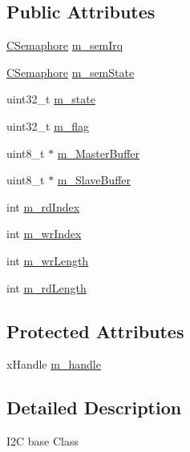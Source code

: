 \subsection*{Public Attributes}
\begin{DoxyCompactItemize}
\item 
\hyperlink{class_c_semaphore}{C\-Semaphore} \hyperlink{class_c_i2_c_afe268dd16ca42e8542c67a7f574df789}{m\-\_\-sem\-Irq}
\item 
\hyperlink{class_c_semaphore}{C\-Semaphore} \hyperlink{class_c_i2_c_aed6c05c74c281a6ae0dcc8e0203511b1}{m\-\_\-sem\-State}
\item 
uint32\-\_\-t \hyperlink{class_c_i2_c_aa2da331d3ad66d64a25d63405882be4c}{m\-\_\-state}
\item 
uint32\-\_\-t \hyperlink{class_c_i2_c_a4c29db1010457d99b12ac6097219bcc8}{m\-\_\-flag}
\item 
uint8\-\_\-t $\ast$ \hyperlink{class_c_i2_c_ae7fd0860329b89d55cfe5ca214b705e2}{m\-\_\-\-Master\-Buffer}
\item 
uint8\-\_\-t $\ast$ \hyperlink{class_c_i2_c_a4ef901e7efdef3f95faa2dd08d548aed}{m\-\_\-\-Slave\-Buffer}
\item 
int \hyperlink{class_c_i2_c_ad8b02ac3b8cfe93c0e123f7c4d79709b}{m\-\_\-rd\-Index}
\item 
int \hyperlink{class_c_i2_c_ad2e77f79779205f9c2ae13f7a4fc9168}{m\-\_\-wr\-Index}
\item 
int \hyperlink{class_c_i2_c_afc1ac8b1f15f1e74dd4a884fb9fe342a}{m\-\_\-wr\-Length}
\item 
int \hyperlink{class_c_i2_c_a517d08ec5c1a44662ab923bb74c6a25c}{m\-\_\-rd\-Length}
\end{DoxyCompactItemize}
\subsection*{Protected Attributes}
\begin{DoxyCompactItemize}
\item 
x\-Handle \hyperlink{class_c_i2_c_aef073fe282d448add47eb63b3f481205}{m\-\_\-handle}
\end{DoxyCompactItemize}


\subsection{Detailed Description}
I2\-C base Class 

